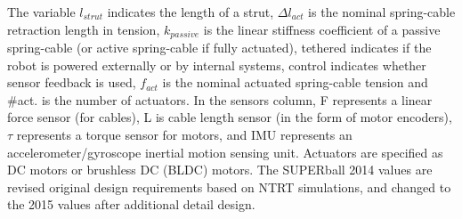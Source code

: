 \begin{table}[ht]
\caption{\SB{} and Related Robots Design Overview.} 
\label{design_req}

\begin{center}%
\end{center}
\bigskip
\fontsize{10pt}{12pt}\selectfont
The variable $l_{strut}$ indicates the length of a strut, $\Delta l_{act}$ is the nominal spring-cable retraction length in tension, $k_{passive}$ is the linear stiffness coefficient of a passive spring-cable (or active spring-cable if fully actuated), tethered indicates if the robot is powered externally or by internal systems, control indicates whether sensor feedback is used, $f_{act}$ is the nominal actuated spring-cable tension and \#act. is the number of actuators. In the sensors column, F represents a linear force sensor (for cables), L is cable length sensor (in the form of motor encoders), $\tau$ represents a torque sensor for motors, and IMU represents an accelerometer/gyroscope inertial motion sensing unit. Actuators are specified as DC motors or brushless DC (BLDC) motors. The SUPERball 2014 values are revised original design requirements based on NTRT simulations, and changed to the 2015 values after additional detail design. %


\end{table}


